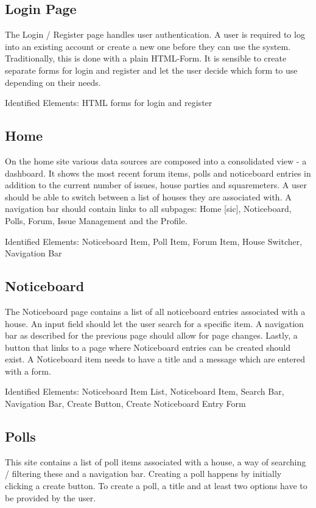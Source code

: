 \subsection{Login Page}
The Login / Register page handles user authentication. A user is required to log into an existing account or create a new one before they can use the system. Traditionally, this is done with a plain HTML-Form. It is sensible to create separate forms for login and register and let the user decide which form to use depending on their needs. \newline

Identified Elements: HTML forms for login and register

\subsection{Home}
On the home site various data sources are composed into a consolidated view - a dashboard. It shows the most recent forum items, polls and noticeboard entries in addition to the current number of issues, house parties and squaremeters. A user should be able to switch between a list of houses they are associated with. A navigation bar should contain links to all subpages: Home [sic], Noticeboard, Polls, Forum, Issue Management and the Profile. \newline

Identified Elements: Noticeboard Item, Poll Item, Forum Item, House Switcher, Navigation Bar

\subsection{Noticeboard}
The Noticeboard page contains a list of all noticeboard entries associated with a house. An input field should let the user search for a specific item. A navigation bar as described for the previous page should allow for page changes. Lastly, a button that links to a page where Noticeboard entries can be created should exist. A Noticeboard item needs to have a title and a message which are entered with a form. \newline

Identified Elements: Noticeboard Item List, Noticeboard Item, Search Bar, Navigation Bar, Create Button, Create Noticeboard Entry Form

\subsection{Polls}
This site contains a list of poll items associated with a house, a way of searching / filtering these and a navigation bar. Creating a poll happens by initially clicking a create button. To create a poll, a title and at least two options have to be provided by the user.

